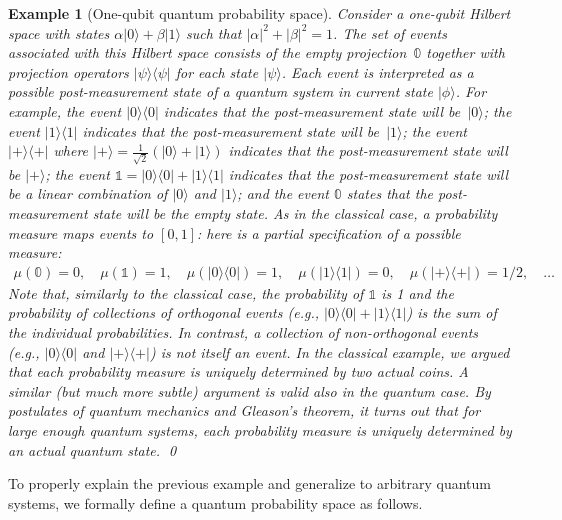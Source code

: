 \documentclass{article}
\theoremstyle{indented}
\newtheorem{example}{Example}
\newcommand{\ket}[1]{|#1\rangle}
\newcommand{\proj}[1]{|#1 \rangle\langle #1 |}
\newcommand{\ps}{\texttt{+}}
\begin{document}
\begin{example}[One-qubit quantum probability space] 
  Consider a one-qubit Hilbert space with states
  $\alpha \ket{0} + \beta \ket{1}$ such that
  $|\alpha|^2 + |\beta|^2 = 1$. The set of events associated with this
  Hilbert space consists of the empty projection~$\mathbb{0}$ together 
  with projection operators $\proj{\psi}$ for each state $\ket{\psi}$.
  Each event is interpreted as a possible post-measurement state of a
  quantum system in current state $\ket{\phi}$. For example, the event
  $\proj{0}$ indicates that the post-measurement state will
  be~$\ket{0}$; the event $\proj{1}$ indicates that the
  post-measurement state will be~$\ket{1}$; the event $\proj{\ps}$
  where $\ket{\ps} = \frac{1}{\sqrt{2}}(\ket{0}+\ket{1})$ indicates
  that the post-measurement state will be $\ket{\ps}$; the event
  $\mathbb{1} = \proj{0}+\proj{1}$ indicates that the post-measurement
  state will be a linear combination of $\ket{0}$ and $\ket{1}$; and
  the event $\mathbb{0}$ states that the post-measurement state will
  be the empty state. As in the classical case, a probability measure
  maps events to $[0,1]$: here is a partial specification of a
  possible measure:
\[\begin{array}{rcl}
\mu\left(\mathbb{0}\right) = 0, \quad
\mu\left(\mathbb{1}\right) =  1, \quad
\mu\left(\proj{0}\right) = 1, \quad
\mu\left(\proj{1}\right) = 0, \quad
\mu\left(\proj{\ps}\right) = 1/2, \quad \ldots
\end{array}\]
Note that, similarly to the classical case, the probability of
$\mathbb{1}$ is 1 and the probability of collections of orthogonal
events (e.g., $\proj{0}+\proj{1}$) is the sum of the individual
probabilities. In contrast, a collection of non-orthogonal events
(e.g., $\proj{0}$ and $\proj{\ps}$) is not itself an event.
In the classical example, we argued that each probability measure is
uniquely determined by two actual coins. A similar (but much more
subtle) argument is valid also in the quantum case. By postulates of
quantum mechanics and Gleason's theorem, it turns out that for large
enough quantum systems, each probability measure is uniquely
determined by an actual quantum state.
\qed\end{example}

To properly explain the previous example and generalize to arbitrary
quantum systems, we formally define a quantum probability space as
follows.
\end{document}
